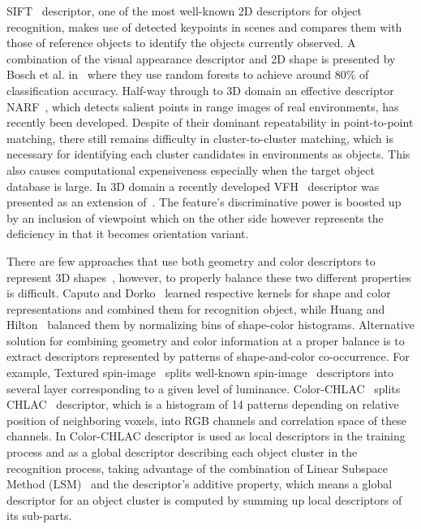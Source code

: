 \documentclass[conference]{sty/IEEEtran}
\begin{document}
SIFT~\cite{lowe04distinctive} descriptor, one of the most well-known 2D
descriptors for object recognition, makes use of detected keypoints in
scenes and compares them with those of reference objects to identify the
objects currently observed. A combination of the visual appearance
descriptor and 2D shape is presented by Bosch et al. in~\cite{Bosch07shape}
where they use random forests to achieve around 80\% of classification 
accuracy. Half-way through to 3D domain an effective descriptor
NARF~\cite{steder10irosws}, which detects salient points in range images of
real environments, has recently been developed.  Despite of their dominant
repeatability in point-to-point matching, there still remains difficulty in
cluster-to-cluster matching, which is necessary for identifying each cluster
candidates  in environments as objects. This also causes computational expensiveness
especially when the target object database is large. In 3D domain a recently 
developed VFH~\cite{vfh} descriptor was presented as an extension 
of~\cite{Rusu09ICRA}. The feature's discriminative power is boosted up
by an inclusion of viewpoint which on the other side however represents
the deficiency in that it becomes orientation variant. 

There are few approaches that use both geometry and color descriptors to
represent 3D shapes~\cite{park2006}, however, to properly balance these two
different properties is difficult.  Caputo and Dorko~\cite{caputo2002} learned
respective kernels for shape and color representations and combined them for
recognition object, while Huang and Hilton~\cite{huang2009} balanced them by
normalizing bins of shape-color histograms.  Alternative solution for combining
geometry and color information at a proper balance is to extract descriptors
represented by patterns of shape-and-color co-occurrence.  For example, Textured
spin-image~\cite{cortelazzo2006} splits well-known
spin-image~\cite{Johnson_spin_images} descriptors into several layer
corresponding to a given level of luminance. Color-CHLAC~\cite{kanezaki2010icra} 
splits CHLAC~\cite{kobayashi2004} descriptor, which is a histogram of 14 patterns 
depending on relative position of neighboring voxels, into RGB channels and correlation 
space of these channels.  In \cite{kanezaki2010icra} Color-CHLAC descriptor is used as local
descriptors in the training process and as a global descriptor describing each
object cluster in the recognition process, taking advantage of the combination
of Linear Subspace Method (LSM)~\cite{watanabe1973} and the descriptor's additive property, 
which means a global descriptor for an object cluster is computed by summing up local descriptors of its sub-parts.
\end{document}
